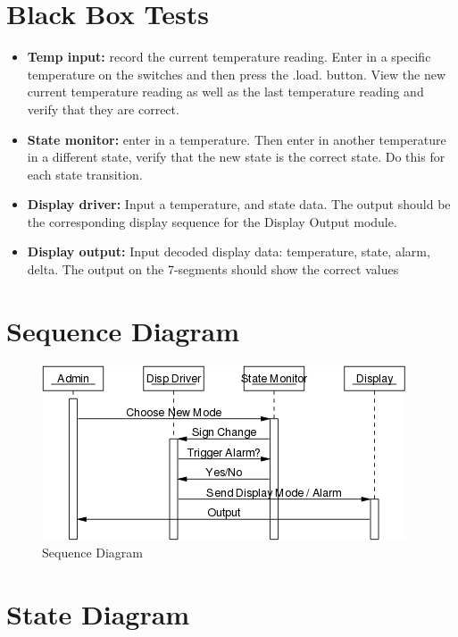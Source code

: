 \documentclass[12pt]{article}
\begin{document}
\section*{Black Box Tests}
        \begin{itemize}
            \item \textbf{Temp input:} record the current temperature reading. Enter in a specific temperature on the switches and then press the .load. button. View the new current temperature reading as well as the last temperature reading and verify that they are correct.
            \item \textbf{State monitor:} enter in a temperature. Then enter in another temperature in a different state, verify that the new state is the correct state. Do this for each state transition.
            \item \textbf{Display driver:} Input a temperature, and state data. The output should be the corresponding display sequence for the Display Output module.
            \item \textbf{Display output:} Input decoded display data: temperature, state, alarm, delta. The output on the 7-segments should show the correct values
        \end{itemize}

\newpage
\section*{Sequence Diagram}

\begin{figure}[!htbp]
\centering
\includegraphics[scale=0.8]{seq_2.png}
\caption{Sequence Diagram}
\label{fig:seq_image}
\end{figure}

\section*{State Diagram}
\end{document}

